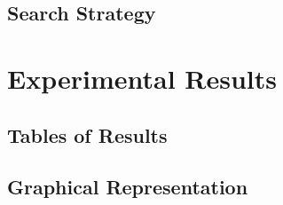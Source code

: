 \subsection{Search Strategy}
\section{Experimental Results}
\subsection{Tables of Results}
\subsection{Graphical Representation}